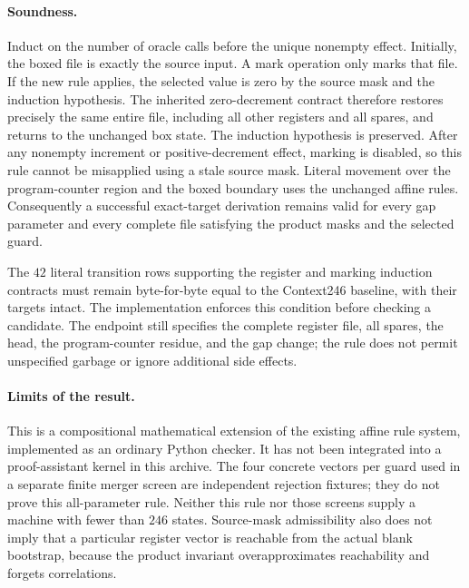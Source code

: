 \paragraph{Soundness.}
Induct on the number of oracle calls before the unique nonempty effect.
Initially, the boxed file is exactly the source input.  A mark operation only
marks that file.  If the new rule applies, the selected value is zero by the
source mask and the induction hypothesis.  The inherited zero-decrement
contract therefore restores precisely the same entire file, including all
other registers and all spares, and returns to the unchanged box state.
The induction hypothesis is preserved.  After any nonempty increment or
positive-decrement effect, marking is disabled, so this rule cannot be
misapplied using a stale source mask.  Literal movement over the program-counter
region and the boxed boundary uses the unchanged affine rules.  Consequently a
successful exact-target derivation remains valid for every gap parameter and
every complete file satisfying the product masks and the selected guard.

The $42$ literal transition rows supporting the register and marking induction
contracts must remain byte-for-byte equal to the Context246 baseline, with
their targets intact.  The implementation enforces this condition before
checking a candidate.  The endpoint still specifies the complete register file,
all spares, the head, the program-counter residue, and the gap change; the rule
does not permit unspecified garbage or ignore additional side effects.

\paragraph{Limits of the result.}
This is a compositional mathematical extension of the existing affine rule
system, implemented as an ordinary Python checker.  It has not been integrated
into a proof-assistant kernel in this archive.  The four concrete vectors per
guard used in a separate finite merger screen are independent rejection
fixtures; they do not prove this all-parameter rule.  Neither this rule nor
those screens supply a machine with fewer than $246$ states.  Source-mask
admissibility also does not imply that a particular register vector is reachable
from the actual blank bootstrap, because the product invariant overapproximates
reachability and forgets correlations.
